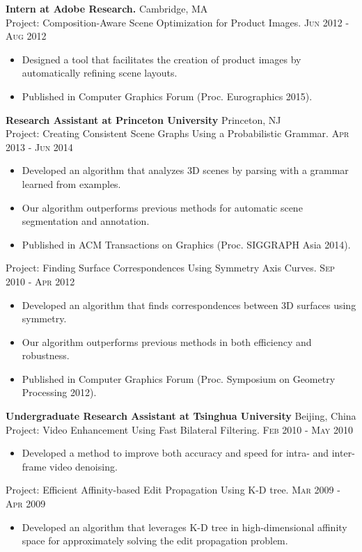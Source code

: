 \documentclass[letterpaper,10pt]{article}
\begin{document}
\textbf{Intern at Adobe Research.} \hfill Cambridge, MA\\
Project: Composition-Aware Scene Optimization for Product Images. \hfill\textsc{Jun} 2012 - \textsc{Aug} 2012
\begin{itemize}
    \item Designed a tool that facilitates the creation of product images by automatically refining scene layouts.
    \item Published in Computer Graphics Forum (Proc. Eurographics 2015).
\end{itemize}
\vspace{0.06in}

\textbf{Research Assistant at Princeton University} \hfill Princeton, NJ\\
Project: Creating Consistent Scene Graphs Using a Probabilistic Grammar. \hfill \textsc{Apr} 2013 - \textsc{Jun} 2014
\begin{itemize}
    \item Developed an algorithm that analyzes 3D scenes by parsing with a grammar learned from examples.
    \item Our algorithm outperforms previous methods for automatic scene segmentation and annotation.
    \item Published in ACM Transactions on Graphics (Proc. SIGGRAPH Asia 2014).
\end{itemize}
Project: Finding Surface Correspondences Using Symmetry Axis Curves. \hfill \textsc{Sep} 2010 - \textsc{Apr} 2012
\begin{itemize}
    \item Developed an algorithm that finds correspondences between 3D surfaces using symmetry.
    \item Our algorithm outperforms previous methods in both efficiency and robustness.
    \item Published in Computer Graphics Forum (Proc. Symposium on Geometry Processing 2012).
\end{itemize}
\vspace{0.06in}

\textbf{Undergraduate Research Assistant at Tsinghua University} \hfill Beijing, China\\
Project: Video Enhancement Using Fast Bilateral Filtering. \hfill  \textsc{Feb} 2010 - \textsc{May} 2010
\begin{itemize}
    \item Developed a method to improve both accuracy and speed for intra- and inter-frame video denoising.
\end{itemize}
Project: Efficient Affinity-based Edit Propagation Using K-D tree. \hfill  \textsc{Mar} 2009 - \textsc{Apr} 2009
\begin{itemize}
    \item Developed an algorithm that leverages K-D tree in high-dimensional affinity space for approximately solving the edit propagation problem.
\end{itemize}
\vspace{0.06in}
\end{document}
